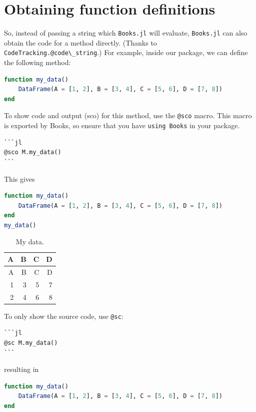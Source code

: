 \documentclass[
  notoc %
]{tufte-book}
\newcommand{\passthrough}[1]{#1}
\begin{document}
\hypertarget{sec:function_code_blocks}{%
\section{Obtaining function
definitions}\label{sec:function_code_blocks}}

So, instead of passing a string which \passthrough{\lstinline!Books.jl!}
will evaluate, \passthrough{\lstinline!Books.jl!} can also obtain the
code for a method directly. (Thanks to
\passthrough{\lstinline!CodeTracking.@code\_string!}.) For example,
inside our package, we can define the following method:

\begin{lstlisting}[language=Julia]
function my_data()
    DataFrame(A = [1, 2], B = [3, 4], C = [5, 6], D = [7, 8])
end
\end{lstlisting}

To show code and output (sco) for this method, use the
\passthrough{\lstinline!@sco!} macro. This macro is exported by Books,
so ensure that you have \passthrough{\lstinline!using Books!} in your
package.

\begin{lstlisting}
```jl
@sco M.my_data()
```
\end{lstlisting}

This gives

\begin{lstlisting}[language=Julia]
function my_data()
    DataFrame(A = [1, 2], B = [3, 4], C = [5, 6], D = [7, 8])
end
my_data()
\end{lstlisting}

\hypertarget{tbl:my_data}{}
\begin{longtable}[]{@{}rrrr@{}}
\caption{\label{tbl:my_data}My data.}\tabularnewline
\toprule
A & B & C & D \\
\midrule
\endfirsthead
\toprule
A & B & C & D \\
\midrule
\endhead
1 & 3 & 5 & 7 \\
2 & 4 & 6 & 8 \\
\bottomrule
\end{longtable}

To only show the source code, use \passthrough{\lstinline!@sc!}:

\begin{lstlisting}
```jl
@sc M.my_data()
```
\end{lstlisting}

resulting in

\begin{lstlisting}[language=Julia]
function my_data()
    DataFrame(A = [1, 2], B = [3, 4], C = [5, 6], D = [7, 8])
end
\end{lstlisting}
\end{document}
